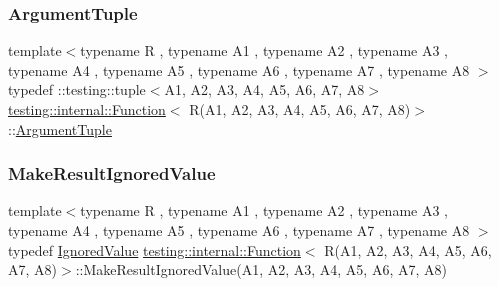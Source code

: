 \subsubsection{\texorpdfstring{ArgumentTuple}{ArgumentTuple}}
{\footnotesize\ttfamily template$<$typename R , typename A1 , typename A2 , typename A3 , typename A4 , typename A5 , typename A6 , typename A7 , typename A8 $>$ \\
typedef \+::testing\+::tuple$<$A1, A2, A3, A4, A5, A6, A7, A8$>$ \mbox{\hyperlink{structtesting_1_1internal_1_1Function}{testing\+::internal\+::\+Function}}$<$ R(A1, A2, A3, A4, A5, A6, A7, A8)$>$\+::\mbox{\hyperlink{structtesting_1_1internal_1_1Function_3_01R_07_08_4_ad483c3128c470d8cdb55c3ac1c575c11}{Argument\+Tuple}}}

\mbox{\label{structtesting_1_1internal_1_1Function_3_01R_07A1_00_01A2_00_01A3_00_01A4_00_01A5_00_01A6_00_01A7_00_01A8_08_4_a845b40c19850bfb84cdd778e2fb51b3d}} 
\subsubsection{\texorpdfstring{MakeResultIgnoredValue}{MakeResultIgnoredValue}}
{\footnotesize\ttfamily template$<$typename R , typename A1 , typename A2 , typename A3 , typename A4 , typename A5 , typename A6 , typename A7 , typename A8 $>$ \\
typedef \mbox{\hyperlink{classtesting_1_1internal_1_1IgnoredValue}{Ignored\+Value}} \mbox{\hyperlink{structtesting_1_1internal_1_1Function}{testing\+::internal\+::\+Function}}$<$ R(A1, A2, A3, A4, A5, A6, A7, A8)$>$\+::Make\+Result\+Ignored\+Value(A1, A2, A3, A4, A5, A6, A7, A8)}

\mbox{\label{structtesting_1_1internal_1_1Function_3_01R_07A1_00_01A2_00_01A3_00_01A4_00_01A5_00_01A6_00_01A7_00_01A8_08_4_a421404d7553350ee8a1890a21d9fbc55}} 
